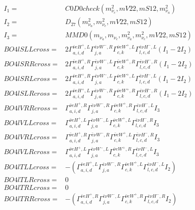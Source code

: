\documentclass[A4,landscape]{article}
\begin{document}
\begin{align} 
I_1 = & C0D0check(m^2_{\nu_{{c}}}, mV22, mS12, m^2_{\nu_{{a}}}) \\ 
I_2 = & D_{27}(m^2_{\nu_{{a}}}, m^2_{\nu_{{c}}}, mV22, mS12) \\ 
I_3 = & MMD0(m_{\nu_{{a}}}, m_{\nu_{{c}}}, m^2_{\nu_{{a}}}, m^2_{\nu_{{c}}}, mV22, mS12) \\ 
  BO4lSLLcross= & 2  \Gamma^{\bar{\nu}e H^+,L}_{a, i, d} \Gamma^{\bar{e}\nu W^- ,R}_{j, a} \Gamma^{\bar{\nu}e W^+,L}_{c, k} \Gamma^{\bar{e}\nu H^- ,L}_{l, c, d} (I_1 - 2 I_2) \\ 
  BO4lSRRcross= & 2  \Gamma^{\bar{\nu}e H^+,R}_{a, i, d} \Gamma^{\bar{e}\nu W^- ,L}_{j, a} \Gamma^{\bar{\nu}e W^+,R}_{c, k} \Gamma^{\bar{e}\nu H^- ,R}_{l, c, d} (I_1 - 2 I_2) \\ 
  BO4lSRLcross= & 2  \Gamma^{\bar{\nu}e H^+,R}_{a, i, d} \Gamma^{\bar{e}\nu W^- ,L}_{j, a} \Gamma^{\bar{\nu}e W^+,L}_{c, k} \Gamma^{\bar{e}\nu H^- ,L}_{l, c, d} (I_1 - 2 I_2) \\ 
  BO4lSLRcross= & 2  \Gamma^{\bar{\nu}e H^+,L}_{a, i, d} \Gamma^{\bar{e}\nu W^- ,R}_{j, a} \Gamma^{\bar{\nu}e W^+,R}_{c, k} \Gamma^{\bar{e}\nu H^- ,R}_{l, c, d} (I_1 - 2 I_2) \\ 
  BO4lVRRcross= &  \Gamma^{\bar{\nu}e H^+,R}_{a, i, d} \Gamma^{\bar{e}\nu W^- ,R}_{j, a} \Gamma^{\bar{\nu}e W^+,R}_{c, k} \Gamma^{\bar{e}\nu H^- ,L}_{l, c, d} I_3 \\ 
  BO4lVLLcross= &  \Gamma^{\bar{\nu}e H^+,L}_{a, i, d} \Gamma^{\bar{e}\nu W^- ,L}_{j, a} \Gamma^{\bar{\nu}e W^+,L}_{c, k} \Gamma^{\bar{e}\nu H^- ,R}_{l, c, d} I_3 \\ 
  BO4lVRLcross= &  \Gamma^{\bar{\nu}e H^+,R}_{a, i, d} \Gamma^{\bar{e}\nu W^- ,R}_{j, a} \Gamma^{\bar{\nu}e W^+,L}_{c, k} \Gamma^{\bar{e}\nu H^- ,R}_{l, c, d} I_3 \\ 
  BO4lVLRcross= &  \Gamma^{\bar{\nu}e H^+,L}_{a, i, d} \Gamma^{\bar{e}\nu W^- ,L}_{j, a} \Gamma^{\bar{\nu}e W^+,R}_{c, k} \Gamma^{\bar{e}\nu H^- ,L}_{l, c, d} I_3 \\ 
  BO4lTLLcross= & -( \Gamma^{\bar{\nu}e H^+,L}_{a, i, d} \Gamma^{\bar{e}\nu W^- ,R}_{j, a} \Gamma^{\bar{\nu}e W^+,L}_{c, k} \Gamma^{\bar{e}\nu H^- ,L}_{l, c, d} I_2) \\ 
  BO4lTLRcross= & 0 \\ 
  BO4lTRLcross= & 0 \\ 
  BO4lTRRcross= & -( \Gamma^{\bar{\nu}e H^+,R}_{a, i, d} \Gamma^{\bar{e}\nu W^- ,L}_{j, a} \Gamma^{\bar{\nu}e W^+,R}_{c, k} \Gamma^{\bar{e}\nu H^- ,R}_{l, c, d} I_2) \\ 
\end{align} 
\end{document}
